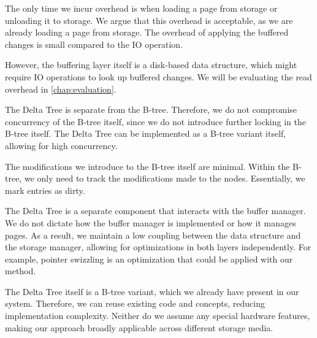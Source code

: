 The only time we incur overhead is when loading a page from storage or unloading it to storage.
We argue that this overhead is acceptable, as we are already loading a page from storage.
The overhead of applying the buffered changes is small compared to the \ac{IO} operation.

However, the buffering layer itself is a disk-based data structure, which might require \ac{IO} operations to look up buffered changes.
We will be evaluating the read overhead in \autoref{chap:evaluation}.

The Delta Tree is separate from the B-tree.
Therefore, we do not compromise concurrency of the B-tree itself, since we do not introduce further locking in the B-tree itself.
The Delta Tree can be implemented as a B-tree variant itself, allowing for high concurrency.

The modifications we introduce to the B-tree itself are minimal.
Within the B-tree, we only need to track the modifications made to the nodes.
Essentially, we mark entries as dirty. 

The Delta Tree is a separate component that interacts with the buffer manager.
We do not dictate how the buffer manager is implemented or how it manages pages.
As a result, we maintain a low coupling between the data structure and the storage manager, allowing for optimizations in both layers independently.
For example, pointer swizzling is an optimization that could be applied with our method.

The Delta Tree itself is a B-tree variant, which we already have present in our system.
Therefore, we can reuse existing code and concepts, reducing implementation complexity.
Neither do we assume any special hardware features, making our approach broadly applicable across different storage media.



